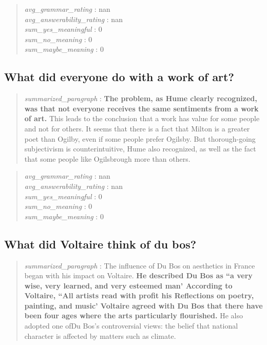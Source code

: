 \begin{quote}
\emph{avg\_grammar\_rating} : nan\\
\emph{avg\_answerability\_rating} : nan\\
\emph{sum\_yes\_meaningful} : 0\\
\emph{sum\_no\_meaning} : 0\\
\emph{sum\_maybe\_meaning} : 0
\end{quote}

\hypertarget{what-did-everyone-do-with-a-work-of-art}{%
\subsection{What did everyone do with a work of
art?}\label{what-did-everyone-do-with-a-work-of-art}}

\begin{quote}
\emph{summarized\_paragraph} : \textbf{The problem, as Hume clearly
recognized, was that not everyone receives the same sentiments from a
work of art.} This leads to the conclusion that a work has value for
some people and not for others. It seems that there is a fact that
Milton is a greater poet than Ogilby, even if some people prefer
Ogilsby. But thorough-going subjectivism is counterintuitive, Hume also
recognized, as well as the fact that some people like Ogilsbrough more
than others.
\end{quote}

\begin{quote}
\emph{avg\_grammar\_rating} : nan\\
\emph{avg\_answerability\_rating} : nan\\
\emph{sum\_yes\_meaningful} : 0\\
\emph{sum\_no\_meaning} : 0\\
\emph{sum\_maybe\_meaning} : 0
\end{quote}

\hypertarget{what-did-voltaire-think-of-du-bos}{%
\subsection{What did Voltaire think of du
bos?}\label{what-did-voltaire-think-of-du-bos}}

\begin{quote}
\emph{summarized\_paragraph} : The influence of Du Bos on aesthetics in
France began with his impact on Voltaire. \textbf{He described Du Bos as
``a very wise, very learned, and very esteemed man' According to
Voltaire, ``All artists read with profit his Reflections on poetry,
painting, and music' Voltaire agreed with Du Bos that there have been
four ages where the arts particularly flourished.} He also adopted one
ofDu Bos's controversial views: the belief that national character is
affected by matters such as climate.
\end{quote}

